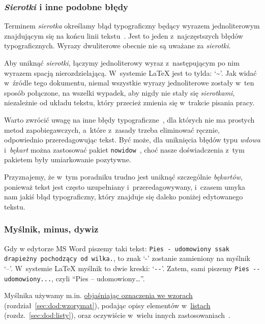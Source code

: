 \subsubsection{{\em Sierotki\/} i inne podobne błędy}
\label{sec:dod:sierotki}

Terminem {\em sierotka} określamy błąd typograficzny będący wyrazem jednoliterowym znajdującym się na końcu linii tekstu~. Jest to jeden z~najczęstszych błędów typograficznych. Wyrazy dwuliterowe obecnie nie są uważane za {\em sierotki}. 

Aby uniknąć {\em sierotki}, łączymy jednoliterowy wyraz z~następującym po nim wyrazem spacją nierozdzielającą. W~systemie \LaTeX{} jest to tylda: `\~{}'. Jak widać w~źródle tego dokumentu, niemal wszystkie wyrazy jednoliterowe zostały w~ten sposób połączone, na wszelki wypadek, aby nigdy nie stały się {\em sierotkami}, niezależnie od układu tekstu, który przecież zmienia się w~trakcie pisania pracy.

Warto zwrócić uwagę na inne błędy typograficzne~, dla których nie ma prostych metod zapobiegawczych, a~które z~zasady trzeba eliminować ręcznie, odpowiednio przeredagowując tekst. Być może, dla uniknięcia błędów typu {\em wdowa} i~{\em bękart} można zastosować pakiet {\tt nowidow}~, choć nasze doświadczenia z~tym pakietem były umiarkowanie pozytywne.

Przyznajemy, że w~tym poradniku trudno jest uniknąć szczególnie {\em bękartów}, ponieważ tekst jest często uzupełniany i~przeredagowywany, i~czasem umyka nam jakiś błąd typograficzny, który znajduje się daleko poniżej edytowanego tekstu.


\subsubsection{Myślnik, minus, dywiz}
\label{sec:dod:myslnik-minus-dywiz}

Gdy w edytorze MS Word piszemy taki tekst: {\tt Pies - udomowiony ssak drapieżny pochodzący od wilka.}, to znak `-' zostanie zamieniony na myślnik `--'. W~systemie \LaTeX{} myślnik to dwie kreski: `\verb+--+'. Zatem, sami piszemy \verb+Pies -- udomowiony...+, czyli ``Pies -- udomowiony\dots''.

Myślnika używamy m.in. \hyperref[sec:dod:wzorymat]{objaśniając oznaczenia we wzorach} (rozdział~\ref{sec:dod:wzorymat}), podając opisy elementów w~\hyperref[sec:dod:listy]{listach} (rozdz.~\ref{sec:dod:listy}), oraz oczywiście w~wielu innych zastosowaniach~.

